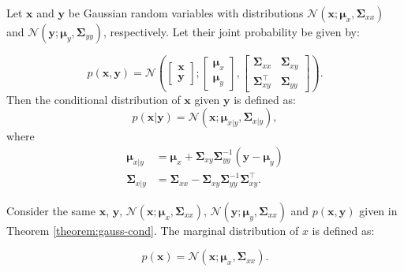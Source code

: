 \begin{theorem}\label{theorem:gauss-cond}
    Let $\mathbf{x}$ and $\mathbf{y}$ be Gaussian random variables with distributions $\mathscr{N}\left(\mathbf{x} ; \mathbf\mu_x, \mathbf\Sigma_{xx}\right)$ and $\mathscr{N}\left(\mathbf{y} ; \mathbf\mu_y, \mathbf\Sigma_{yy}\right)$, respectively. Let their joint probability be given by:

    \begin{equation*}
        p(\mathbf{x}, \mathbf{y}) = \mathscr{N}\left(
            \begin{bmatrix}
                \mathbf{x} \\
                \mathbf{y}
            \end{bmatrix};
            \begin{bmatrix}
                \boldsymbol\mu_x \\
                \boldsymbol\mu_y
            \end{bmatrix},
            \begin{bmatrix}
                \mathbf{\Sigma}_{xx} & \mathbf{\Sigma}_{xy} \\
                \mathbf{\Sigma}_{xy}^\intercal & \mathbf{\Sigma}_{yy}
            \end{bmatrix}
        \right).
    \end{equation*}
    Then the conditional distribution of $\mathbf{x}$ given $\mathbf{y}$ is defined as:
    \begin{equation}\label{eq:gauss-cond}
        p(\mathbf{x}|\mathbf{y}) =
        \mathscr{N}\left(\mathbf{x}; \boldsymbol\mu_{x|y}, \mathbf\Sigma_{x|y}\right),
    \end{equation}
    where
    \begin{align}
        \boldsymbol\mu_{x|y}
        &= \boldsymbol\mu_x + \mathbf{\Sigma}_{xy} \mathbf{\Sigma}_{yy}^{-1}(\mathbf{y} - \boldsymbol\mu_y) \\
        \mathbf\Sigma_{x|y} 
        &= \mathbf\Sigma_{xx} - \mathbf\Sigma_{xy}\mathbf\Sigma_{yy}^{-1}\mathbf\Sigma_{xy}^\intercal.\label{eq:gauss-cond-params}
    \end{align}
\end{theorem}

\begin{theorem}\label{theorem:gauss-marg}
    Consider the same $\mathbf{x}$, $\mathbf{y}$, $\mathscr{N}\left(\mathbf{x} ; \mathbf\mu_x, \mathbf\Sigma_{xx}\right)$, $\mathscr{N}\left(\mathbf{y} ; \mathbf\mu_y, \mathbf\Sigma_{xx}\right)$ and $p(\mathbf{x}, \mathbf{y})$ given in Theorem \ref{theorem:gauss-cond}. The marginal distribution of $x$ is defined as:

    \begin{equation*}
        p(\mathbf{x}) = \mathscr{N}\left(\mathbf{x} ; \mathbf\mu_x, \mathbf\Sigma_{xx}\right).
    \end{equation*}
\end{theorem}

